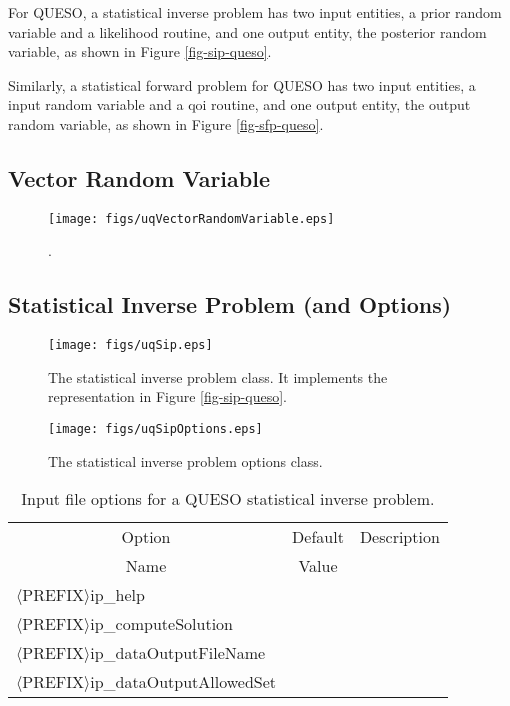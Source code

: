 For QUESO, a statistical inverse problem has two input entities, a prior random variable and
a likelihood routine, and one output entity, the posterior random variable, as shown in Figure \ref{fig-sip-queso}.

Similarly, a statistical forward problem for QUESO has two input entities, a input random variable and
a qoi routine, and one output entity, the output random variable, as shown in Figure \ref{fig-sfp-queso}.

\clearpage
\subsection{Vector Random Variable}

\begin{figure}[h!]
\centerline{
\texttt{[image: figs/uqVectorRandomVariable.eps]}
}
\caption{
{\color{red}{The class diagram for the vector random variable class}}.
}
\label{fig-vector-rv-class}
\end{figure}

\clearpage
\subsection{Statistical Inverse Problem (and Options)}

\begin{figure}[h!]
\centerline{
\texttt{[image: figs/uqSip.eps]}
}
\caption{
The statistical inverse problem class. It implements the representation in Figure \ref{fig-sip-queso}.
}
\label{fig-sip-class}
\end{figure}

\begin{figure}[h!]
\begin{center}
\texttt{[image: figs/uqSipOptions.eps]}
\end{center}
\caption{
The statistical inverse problem options class.
}
\label{fig-sip-options-class}
\end{figure}

\begin{table}[!h]
\begin{center}
\begin{tabular}{|l|c|c|}
\hline
\multicolumn{1}{|c|}{Option}                     & Default & Description \\
\multicolumn{1}{|c|}{Name}                       & Value   &             \\
\hline
\hline
$\langle$PREFIX$\rangle$ip\_help                 &         &             \\
\hline
$\langle$PREFIX$\rangle$ip\_computeSolution      &         &             \\
\hline
$\langle$PREFIX$\rangle$ip\_dataOutputFileName   &         &             \\
\hline
$\langle$PREFIX$\rangle$ip\_dataOutputAllowedSet &         &             \\
\hline
\end{tabular}
\end{center}
\caption{
Input file options for a QUESO statistical inverse problem.
}
\label{tab-sip-options}
\end{table}

